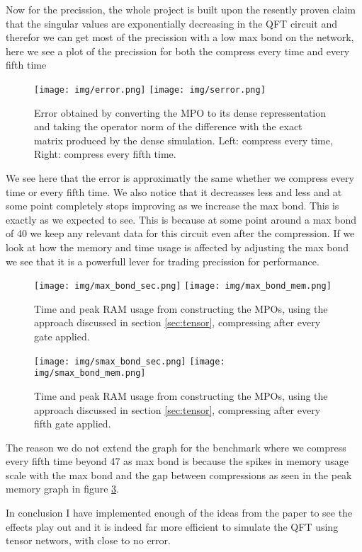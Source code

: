 \vspace{\baselineskip}
\noindent
Now for the precission, the whole project is built upon the resently proven claim that the singular values are exponentially decreasing in the QFT circuit and therefor we can get most of the precission with a low max bond on the network, here we see a plot of the precission for both the compress every time and every fifth time 
\begin{figure}[H]
    \begin{center}
        \texttt{[image: img/error.png]}
        \texttt{[image: img/serror.png]}
    \end{center}
    \caption{Error obtained by converting the MPO to its dense repressentation and taking the operator norm of the difference with the exact matrix produced by the dense simulation. Left: compress every time, Right: compress every fifth time. }
    \label{fig:tensor_error}
\end{figure}
\noindent
We see here that the error is approximatly the same whether we compress every time or every fifth time. We also notice that it decreasses less and less and at some point completely stops improving as we increase the max bond. This is exactly as we expected to see. This is because at some point around a max bond of 40 we keep any relevant data for this circuit even after the compression. If we look at how the memory and time usage is affected by adjusting the max bond we see that it is a powerfull lever for trading precission for performance. 

\begin{figure}[H]
    \begin{center}
        \texttt{[image: img/max\_bond\_sec.png]}
        \texttt{[image: img/max\_bond\_mem.png]}
    \end{center}
    \caption{Time and peak RAM usage from constructing the MPOs, using the approach discussed in section \ref{sec:tensor}, compressing after every gate applied.}
    \label{fig:tensor_perf_max_bond}
\end{figure}
\begin{figure}[H]
    \begin{center}
        \texttt{[image: img/smax\_bond\_sec.png]}
        \texttt{[image: img/smax\_bond\_mem.png]}
    \end{center}
    \caption{Time and peak RAM usage from constructing the MPOs, using the approach discussed in section \ref{sec:tensor}, compressing after every fifth gate applied.}
    \label{fig:stensor_perf_max_bond}
\end{figure}
\noindent
The reason we do not extend the graph for the benchmark where we compress every fifth time beyond 47 as max bond is because the spikes in memory usage scale with the max bond and the gap between compressions as seen in the peak memory graph in figure \ref{fig:stensor_perf_max_bond}. 

\vspace{\baselineskip}
\noindent
In conclusion I have implemented enough of the ideas from the paper to see the effects play out and it is indeed far more efficient to simulate the QFT using tensor networs, with close to no error. 
